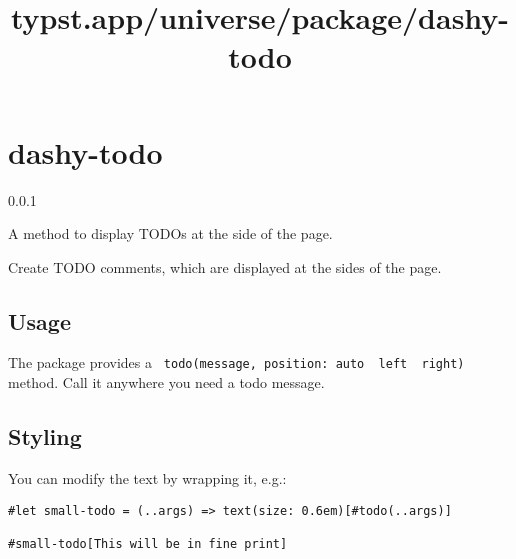 \title{typst.app/universe/package/dashy-todo}

\label{banner}
\section{dashy-todo}\label{dashy-todo}

{ 0.0.1 }

A method to display TODOs at the side of the page.

\label{readme}
Create TODO comments, which are displayed at the sides of the page.

\pandocbounded{}

\subsection{Usage}\label{usage}

The package provides a
\texttt{\ todo(message,\ position:\ auto\ \textbar{}\ left\ \textbar{}\ right)\ }
method. Call it anywhere you need a todo message.

\begin{Shaded}
\begin{Highlighting}[]




\end{Highlighting}
\end{Shaded}

\subsection{Styling}\label{styling}

You can modify the text by wrapping it, e.g.:

\begin{verbatim}
#let small-todo = (..args) => text(size: 0.6em)[#todo(..args)]

#small-todo[This will be in fine print]
\end{verbatim}

